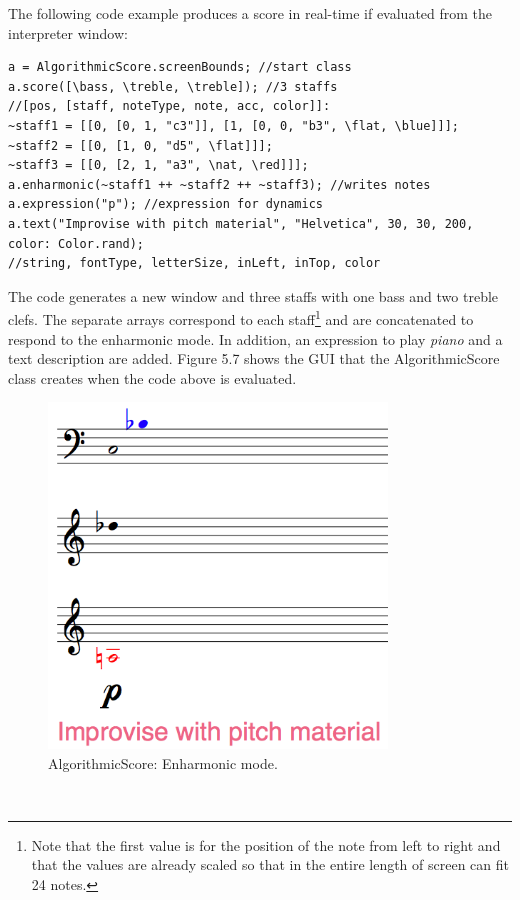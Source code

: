 The following code example produces a score in real-time if evaluated from the interpreter window: 
\begin{verbatim}
a = AlgorithmicScore.screenBounds; //start class
a.score([\bass, \treble, \treble]); //3 staffs
//[pos, [staff, noteType, note, acc, color]]:
~staff1 = [[0, [0, 1, "c3"]], [1, [0, 0, "b3", \flat, \blue]]]; 
~staff2 = [[0, [1, 0, "d5", \flat]]];
~staff3 = [[0, [2, 1, "a3", \nat, \red]]];
a.enharmonic(~staff1 ++ ~staff2 ++ ~staff3); //writes notes
a.expression("p"); //expression for dynamics
a.text("Improvise with pitch material", "Helvetica", 30, 30, 200, color: Color.rand);
//string, fontType, letterSize, inLeft, inTop, color  
\end{verbatim}
The code generates a new window and three staffs with one bass and two treble clefs. The separate arrays correspond to each staff\footnote{Note that the first value is for the position of the note from left to right and that the values are already scaled so that in the entire length of screen can fit 24 notes.} and are concatenated to respond to the enharmonic mode. In addition, an expression to play \emph{piano} and a text description are added. Figure 5.7 shows the GUI that the AlgorithmicScore class creates when the code above is evaluated. 
\begin{figure}[htbp] %
   \centering
   \includegraphics[width=9cm]{chapter5/algoscore1.tif} %
   \caption{AlgorithmicScore: Enharmonic mode.}
   \label{fig:example}
\end{figure}\


